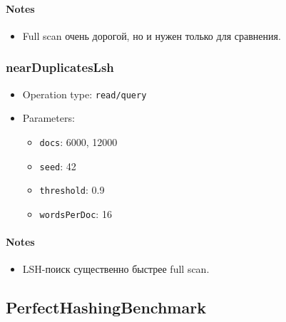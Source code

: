 \documentclass[
  10pt,
]{article}
\providecommand{\tightlist}{%
  \setlength{\itemsep}{0pt}\setlength{\parskip}{0pt}}
\begin{document}
\paragraph{Notes}\label{notes-9}

\begin{itemize}
\tightlist
\item
  Full scan очень дорогой, но и нужен только для сравнения.
\end{itemize}

\subsubsection{nearDuplicatesLsh}\label{nearduplicateslsh}

\begin{itemize}
\tightlist
\item
  Operation type: \texttt{read/query}
\item
  Parameters:

  \begin{itemize}
  \tightlist
  \item
    \texttt{docs}: 6000, 12000
  \item
    \texttt{seed}: 42
  \item
    \texttt{threshold}: 0.9
  \item
    \texttt{wordsPerDoc}: 16
  \end{itemize}
\end{itemize}

\paragraph{Notes}\label{notes-10}

\begin{itemize}
\tightlist
\item
  LSH-поиск существенно быстрее full scan.
\end{itemize}

\subsection{PerfectHashingBenchmark}\label{perfecthashingbenchmark}
\end{document}
